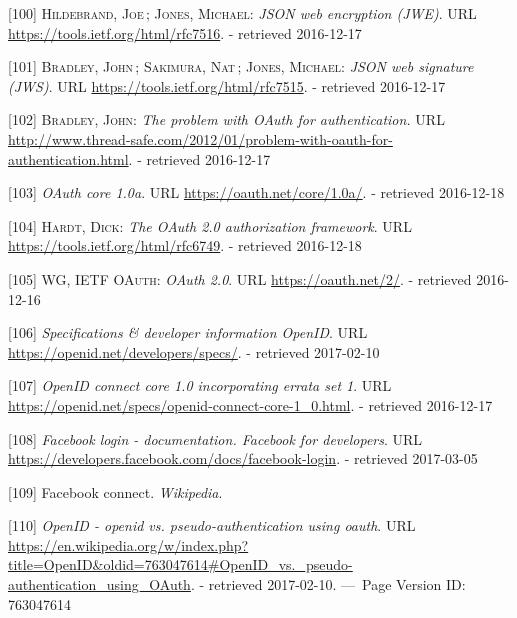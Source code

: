 \documentclass[12pt,english,a4paper,titlepage,cleardoublepage=empty,dottedtoc]{report}
\begin{document}
\hypertarget{ref-web_spec_json-web-encryption}{}
{[}100{]} \textsc{Hildebrand, Joe}\,; \textsc{Jones, Michael}:
\emph{JSON web encryption (JWE)}. URL
\url{https://tools.ietf.org/html/rfc7516}. - retrieved 2016-12-17

\hypertarget{ref-web_spec_json-web-signature}{}
{[}101{]} \textsc{Bradley, John}\,; \textsc{Sakimura, Nat}\,;
\textsc{Jones, Michael}: \emph{JSON web signature (JWS)}. URL
\url{https://tools.ietf.org/html/rfc7515}. - retrieved 2016-12-17

\hypertarget{ref-web_2012_problem-with-oauth-for-authentication}{}
{[}102{]} \textsc{Bradley, John}: \emph{The problem with OAuth for
authentication.} URL
\url{http://www.thread-safe.com/2012/01/problem-with-oauth-for-authentication.html}.
- retrieved 2016-12-17

\hypertarget{ref-web_spec_oauth-1a}{}
{[}103{]} \emph{OAuth core 1.0a}. URL
\url{https://oauth.net/core/1.0a/}. - retrieved 2016-12-18

\hypertarget{ref-web_spec_oauth-2}{}
{[}104{]} \textsc{Hardt, Dick}: \emph{The OAuth 2.0 authorization
framework}. URL \url{https://tools.ietf.org/html/rfc6749}. - retrieved
2016-12-18

\hypertarget{ref-web_2016_oauth-2}{}
{[}105{]} \textsc{WG, IETF OAuth}: \emph{OAuth 2.0}. URL
\url{https://oauth.net/2/}. - retrieved 2016-12-16

\hypertarget{ref-web_spec_openid-spec-index}{}
{[}106{]} \emph{Specifications \& developer information OpenID}. URL
\url{https://openid.net/developers/specs/}. - retrieved 2017-02-10

\hypertarget{ref-web_spec_openid-connect-1}{}
{[}107{]} \emph{OpenID connect core 1.0 incorporating errata set 1}. URL
\url{https://openid.net/specs/openid-connect-core-1_0.html}. - retrieved
2016-12-17

\hypertarget{ref-web_docs_facebook-login}{}
{[}108{]} \emph{Facebook login - documentation. Facebook for
developers}. URL
\url{https://developers.facebook.com/docs/facebook-login}. - retrieved
2017-03-05

\hypertarget{ref-web_2017_wikipedia_facebook-connect}{}
{[}109{]} Facebook connect. \emph{Wikipedia}.

\hypertarget{ref-web_2017_wikipedia_openid-vs-pseudo-oauth}{}
{[}110{]} \emph{OpenID - openid vs. pseudo-authentication using oauth}.
URL
\url{https://en.wikipedia.org/w/index.php?title=OpenID\&oldid=763047614\#OpenID_vs._pseudo-authentication_using_OAuth}.
- retrieved 2017-02-10. ---~Page Version ID: 763047614
\end{document}
